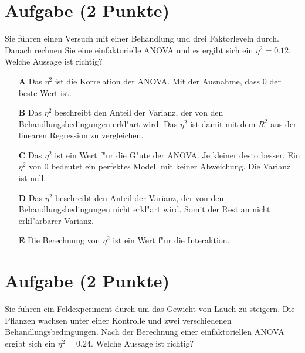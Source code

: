 \documentclass[a4paper, 9pt]{scrartcl}\usepackage[]{graphicx}\usepackage[]{xcolor}
\begin{document}
\section{Aufgabe \hfill (2 Punkte)}





Sie führen einen Versuch mit einer Behandlung und drei Faktorleveln durch. Danach rechnen Sie eine einfaktorielle ANOVA und es ergibt sich ein $\eta^2 = 0.12$. Welche Aussage ist richtig?



\begin{enumerate}
\item [\textbf{A} \msquare] Das $\eta^2$ ist die Korrelation der ANOVA. Mit der Ausnahme, dass 0 der beste Wert ist.
\item [\textbf{B} \msquare] Das $\eta^2$ beschreibt den Anteil der Varianz, der von den Behandlungsbedingungen erkl{"a}rt wird. Das $\eta^2$ ist damit mit dem $R^2$ aus der linearen Regression zu vergleichen.
\item [\textbf{C} \msquare] Das $\eta^2$ ist ein Wert f{"u}r die G{"u}te der ANOVA. Je kleiner desto besser. Ein $\eta^2$ von 0 bedeutet ein perfektes Modell mit keiner Abweichung. Die Varianz ist null.
\item [\textbf{D} \msquare] Das $\eta^2$ beschreibt den Anteil der Varianz, der von den Behandlungsbedingungen nicht erkl{"a}rt wird. Somit der Rest an nicht erkl{"a}rbarer Varianz.
\item [\textbf{E} \msquare] Die Berechnung von $\eta^2$ ist ein Wert f{"u}r die Interaktion.
\end{enumerate} 

\section{Aufgabe \hfill (2 Punkte)}



Sie führen ein Feldexperiment durch um das Gewicht von Lauch zu
steigern. Die Pflanzen wachsen unter einer Kontrolle und zwei verschiedenen
Behandlungsbedingungen. Nach der Berechnung einer einfaktoriellen ANOVA
ergibt sich ein $\eta^2 = 0.24$. Welche Aussage ist richtig?
\end{document}
